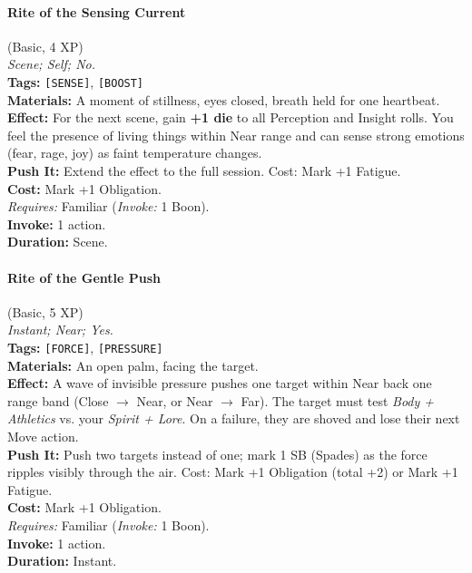 \paragraph{Rite of the Sensing Current} (Basic, 4 XP) \hfill \\
\emph{Scene; Self; No.} \\
\textbf{Tags:} \texttt{[SENSE]}, \texttt{[BOOST]} \\
\textbf{Materials:} A moment of stillness, eyes closed, breath held for one heartbeat. \\
\textbf{Effect:} For the next scene, gain \textbf{+1 die} to all Perception and Insight rolls. You feel the presence of living things within Near range and can sense strong emotions (fear, rage, joy) as faint temperature changes. \\
\textbf{Push It:} Extend the effect to the full session. Cost: Mark +1 Fatigue. \\
\textbf{Cost:} Mark +1 Obligation. \\
\textit{Requires:} Familiar (\textit{Invoke:} 1 Boon). \\
\textbf{Invoke:} 1 action. \\
\textbf{Duration:} Scene.

\paragraph{Rite of the Gentle Push} (Basic, 5 XP) \hfill \\
\emph{Instant; Near; Yes.} \\
\textbf{Tags:} \texttt{[FORCE]}, \texttt{[PRESSURE]} \\
\textbf{Materials:} An open palm, facing the target. \\
\textbf{Effect:} A wave of invisible pressure pushes one target within Near back one range band (Close $\rightarrow$ Near, or Near $\rightarrow$ Far). The target must test \textit{Body + Athletics} vs. your \textit{Spirit + Lore}. On a failure, they are shoved and lose their next Move action. \\
\textbf{Push It:} Push two targets instead of one; mark 1 SB (Spades) as the force ripples visibly through the air. Cost: Mark +1 Obligation (total +2) or Mark +1 Fatigue. \\
\textbf{Cost:} Mark +1 Obligation. \\
\textit{Requires:} Familiar (\textit{Invoke:} 1 Boon). \\
\textbf{Invoke:} 1 action. \\
\textbf{Duration:} Instant.

